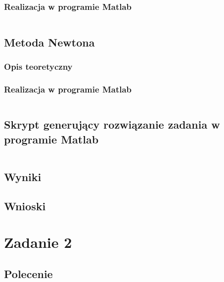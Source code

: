 \documentclass[a4paper, 11pt]{article}
\begin{document}
\subsubsection{Realizacja w programie Matlab}
\begin{lstlisting}

\end{lstlisting}

\subsection{Metoda Newtona}
\subsubsection{Opis teoretyczny}


\subsubsection{Realizacja w programie Matlab}
\begin{lstlisting}

\end{lstlisting}


\subsection{Skrypt generujący rozwiązanie zadania w programie Matlab}
\begin{lstlisting}

\end{lstlisting}
\vspace{1cm}


\subsection{Wyniki}


\subsection{Wnioski}


\section{Zadanie 2}

\subsection{Polecenie}
\end{document}
